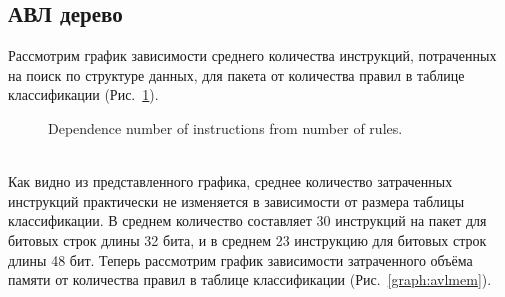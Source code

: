 \documentclass[conference]{IEEEtran}
\begin{document}
        \subsection{АВЛ дерево}
            Рассмотрим график зависимости среднего количества инструкций, потраченных на поиск по структуре данных, для пакета от количества правил в таблице классификации (Рис.~\ref{graph:avlinst}).
            \begin{figure}[ht]
                \centering
                \captionsetup{justification=centering}
                \caption{Dependence number of instructions from number of rules.}
                \label{graph:avlinst}
            \end{figure}
            \\
            Как видно из представленного графика, среднее количество затраченных инструкций практически не изменяется в зависимости от размера таблицы классификации. 
            В среднем количество составляет 30 инструкций на пакет для битовых строк длины 32 бита, и в среднем 23 инструкцию для битовых строк длины 48 бит.
            Теперь рассмотрим график зависимости затраченного объёма памяти от количества правил в таблице классификации (Рис.~\ref{graph:avlmem}).
            \\
\end{document}
